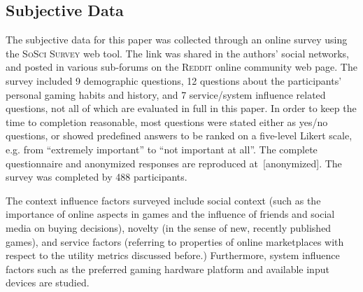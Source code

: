 \subsection{Subjective Data}

The subjective data for this paper was collected through an online
survey using the \textsc{SoSci Survey} web tool. The link was shared
in the authors' social networks, and posted in various sub-forums on
the \textsc{Reddit} online community web page.
The survey included 9 demographic questions, 12 questions about the
participants' personal gaming habits and history, and 7 service/system
influence related questions, not all of which are evaluated in full
in this paper.
In order to keep the time to completion reasonable, most questions
were stated either as yes/no questions, or showed predefined answers
to be ranked on a five-level Likert scale, e.g. from ``extremely
important'' to ``not important at all''.
The complete questionnaire and anonymized responses
are reproduced at~[anonymized].
The survey was completed by 488 participants.

The context influence factors surveyed include social context (such
as the importance of online aspects in games and the influence of
friends and social media on buying decisions), novelty (in the sense
of new, recently published games), and service factors (referring to
properties of online marketplaces with respect to the utility metrics
discussed before.) Furthermore, system influence factors such as
the preferred gaming hardware platform and available input devices
are studied.
